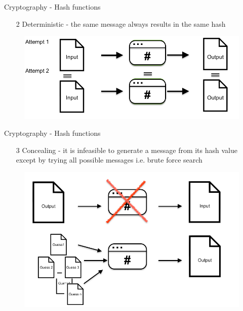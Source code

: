 \documentclass[9pt]{beamer}
\begin{document}
\begin{frame}{Cryptography - Hash functions}
	\begin{enumerate}
		\item[2] Deterministic - the same message always results in the same hash
	\end{enumerate}
	\begin{figure}[]
		\centering
		\includegraphics  [scale=0.3]{Images/hash2}
		\begin{centering}
		\end{centering}
	\end{figure}
\end{frame}


\begin{frame}{Cryptography - Hash functions}
	\begin{enumerate}
		\item[3] Concealing - it is infeasible to generate a message from its hash value except by trying all possible messages i.e. brute force search
	\end{enumerate}
	\begin{figure}[]
		\centering
		\includegraphics  [scale=0.3]{Images/hash3}
		\begin{centering}
		\end{centering}
	\end{figure}
\end{frame}
\end{document}
